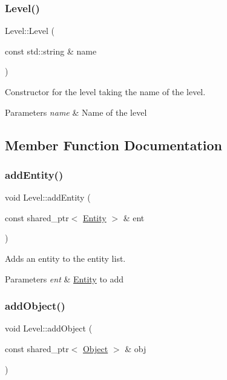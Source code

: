 \subsubsection{\texorpdfstring{Level()}{Level()}\hspace{0.1cm}{\footnotesize\ttfamily [3/3]}}
{\footnotesize\ttfamily Level\+::\+Level (\begin{DoxyParamCaption}\item[{const std\+::string \&}]{name }\end{DoxyParamCaption})\hspace{0.3cm}{\ttfamily [explicit]}}



Constructor for the level taking the name of the level. 


\begin{DoxyParams}{Parameters}
{\em name} & Name of the level \\
\hline
\end{DoxyParams}


\subsection{Member Function Documentation}
\mbox{\label{classLevel_a481a39fdf7392703fc4e3c5715ddfa55}} 
\subsubsection{\texorpdfstring{add\+Entity()}{addEntity()}}
{\footnotesize\ttfamily void Level\+::add\+Entity (\begin{DoxyParamCaption}\item[{const shared\+\_\+ptr$<$ \hyperlink{classEntity}{Entity} $>$ \&}]{ent }\end{DoxyParamCaption})}



Adds an entity to the entity list. 


\begin{DoxyParams}{Parameters}
{\em ent} & \hyperlink{classEntity}{Entity} to add \\
\hline
\end{DoxyParams}
\mbox{\label{classLevel_a3effcc660e97c964a7782231f20fa6d3}} 
\subsubsection{\texorpdfstring{add\+Object()}{addObject()}}
{\footnotesize\ttfamily void Level\+::add\+Object (\begin{DoxyParamCaption}\item[{const shared\+\_\+ptr$<$ \hyperlink{classObject}{Object} $>$ \&}]{obj }\end{DoxyParamCaption})}



